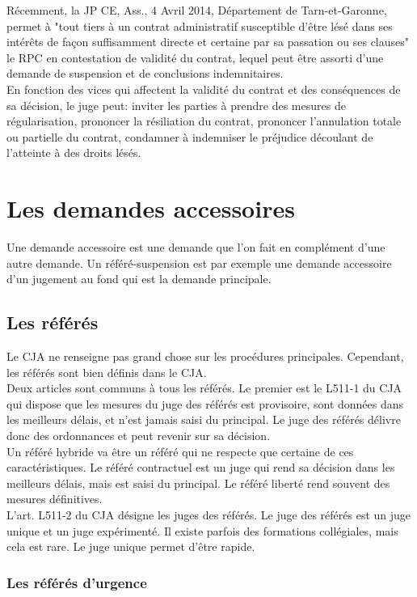\documentclass[10pt, a4paper, openany]{book}
\begin{document}
Récemment, la JP CE, Ass., 4 Avril 2014, Département de Tarn-et-Garonne, permet à "tout tiers à un contrat administratif susceptible d'être lésé dans ses intérêts de façon suffisamment directe et certaine par sa passation ou ses clauses" le RPC en contestation de validité du contrat, lequel peut être assorti d'une demande de suspension et de conclusions indemnitaires. \\
En fonction des vices qui affectent la validité du contrat et des conséquences de sa décision, le juge peut: inviter les parties à prendre des mesures de régularisation, prononcer la résiliation du contrat, prononcer l'annulation totale ou partielle du contrat, condamner à indemniser le préjudice découlant de l'atteinte à des droits lésés. 

\section{Les demandes accessoires}

Une demande accessoire est une demande que l'on fait en complément d'une autre demande. Un référé-suspension est par exemple une demande accessoire d'un jugement au fond qui est la demande principale. 

\subsection{Les référés}

Le CJA ne renseigne pas grand chose sur les procédures principales. Cependant, les référés sont bien définis dans le CJA. \\
Deux articles sont communs à tous les référés. Le premier est le L511-1 du CJA qui dispose que les mesures du juge des référés est provisoire, sont données dans les meilleurs délais, et n'est jamais saisi du principal. Le juge des référés délivre donc des ordonnances et peut revenir sur sa décision. \\
Un référé hybride va être un référé qui ne respecte que certaine de ces caractéristiques. Le référé contractuel est un juge qui rend sa décision dans les meilleurs délais, mais est saisi du principal. Le référé liberté rend souvent des mesures définitives. \\
L'art. L511-2 du CJA désigne les juges des référés. Le juge des référés est un juge unique et un juge expérimenté. Il existe parfois des formations collégiales, mais cela est rare. Le juge unique permet d'être rapide. 

\subsubsection{Les référés d'urgence}
\end{document}

